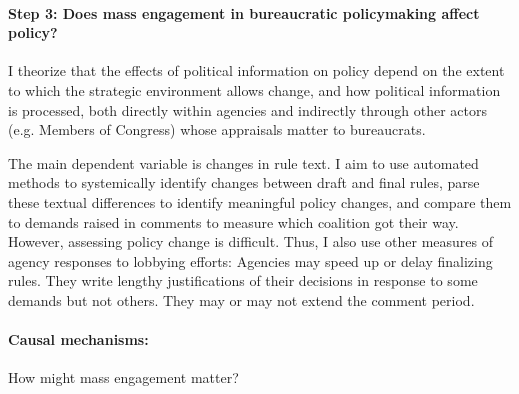 





\paragraph{Step 3: Does mass engagement in bureaucratic policymaking affect policy?} 

I theorize that the effects of political information on policy depend on the extent to which the strategic environment allows change, and how political information is processed, both directly within agencies and indirectly through other actors (e.g. Members of Congress) whose appraisals matter to bureaucrats.

The main dependent variable is changes in rule text.
I aim to use automated methods to systemically identify changes between draft and final rules, parse these textual differences to identify meaningful policy changes, and compare them to demands raised in comments to measure which coalition got their way. However, assessing policy change is difficult. Thus, I also use other measures of agency responses to lobbying efforts: 
Agencies may speed up or delay finalizing rules. They write lengthy justifications of their decisions in response to some demands but not others. They may or may not extend the comment period.


\paragraph{Causal mechanisms:} How might mass engagement matter?

